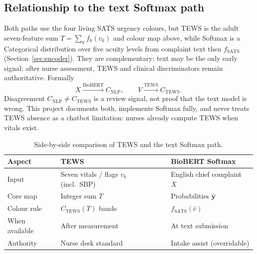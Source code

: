 \subsection{Relationship to the text Softmax path}

Both paths use the four living SATS urgency colours, but TEWS is the adult seven-feature sum \(T=\sum_k f_k(v_k)\) and colour map above, while Softmax is a Categorical distribution over five acuity levels from complaint text then \(f_{\mathrm{SATS}}\) (Section~\ref{sec:encoder}). They are complementary: text may be the only early signal; after nurse assessment, TEWS and clinical discriminators remain authoritative. Formally
\[
  X \xrightarrow{\mathrm{BioBERT}} C_{\mathrm{NLP}},
  \qquad
  V \xrightarrow{\mathrm{TEWS}} C_{\mathrm{TEWS}}.
\]
Disagreement \(C_{\mathrm{NLP}}\neq C_{\mathrm{TEWS}}\) is a review signal, not proof that the text model is wrong. This project documents both, implements Softmax fully, and never treats TEWS absence as a chatbot limitation: nurses already compute TEWS when vitals exist.

\begin{table}[H]
\centering
\small
\begin{tabular}{|l|p{5.2cm}|p{5.2cm}|}
\hline
\textbf{Aspect} & \textbf{TEWS} & \textbf{BioBERT Softmax} \\
\hline
Input & Seven vitals / flags \(v_k\) (incl.\ SBP) & English chief complaint \(X\) \\
Core map & Integer sum \(T\) & Probabilities \(\hat{\mathbf{y}}\) \\
Colour rule & \(C_{\mathrm{TEWS}}(T)\) bands & \(f_{\mathrm{SATS}}(\hat{c})\) \\
When available & After measurement & At text submission \\
Authority & Nurse desk standard & Intake assist (overridable) \\
\hline
\end{tabular}
\caption{Side-by-side comparison of TEWS and the text Softmax path.}
\label{tab:tews-vs-softmax}
\end{table}

